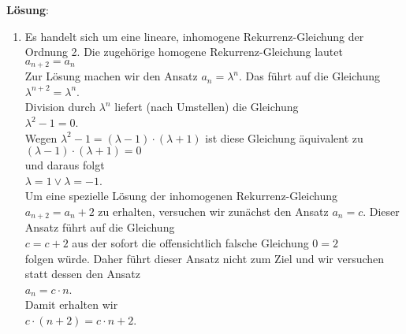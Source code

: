 \documentclass{article}
\begin{document}
\noindent
\textbf{L\"osung}:
\begin{enumerate}
\item Es handelt sich um eine lineare, inhomogene Rekurrenz-Gleichung der Ordnung 2.
      Die zugeh\"orige homogene Rekurrenz-Gleichung lautet
      \\[0.2cm]
      \hspace*{1.3cm}
      $a_{n+2} = a_n$
      \\[0.2cm]
      Zur L\"osung machen wir den Ansatz $a_n = \lambda^n$.  Das f\"uhrt auf die Gleichung
      \\[0.2cm]
      \hspace*{1.3cm}
      $\lambda^{n+2} = \lambda^n$.
      \\[0.2cm]
      Division durch $\lambda^n$ liefert (nach Umstellen) die Gleichung
      \\[0.2cm]
      \hspace*{1.3cm}
      $\lambda^2 - 1 = 0$.
      \\[0.2cm]
      Wegen $\lambda^2 - 1 = (\lambda - 1) \cdot (\lambda + 1)$ ist diese Gleichung \"aquivalent zu
      \\[0.2cm]
      \hspace*{1.3cm}
      $(\lambda - 1) \cdot (\lambda + 1) = 0$
      \\[0.2cm]
      und daraus folgt
      \\[0.2cm]
      \hspace*{1.3cm}
      $\lambda = 1 \vee \lambda = - 1$.
      \\[0.2cm]
      Um eine spezielle L\"osung der inhomogenen Rekurrenz-Gleichung $a_{n+2} = a_n +2$ zu erhalten,
      versuchen wir zun\"achst den Ansatz $a_n = c$.  Dieser Ansatz f\"uhrt auf die Gleichung
      \\[0.2cm]
      \hspace*{1.3cm}
      $c = c + 2$ \quad aus der sofort die offensichtlich falsche Gleichung \quad $0 = 2$
      \\[0.2cm]
      folgen w\"urde.  Daher f\"uhrt dieser Ansatz nicht zum Ziel und wir versuchen statt dessen den Ansatz
      \\[0.2cm]
      \hspace*{1.3cm}
      $a_n = c \cdot n$.
      \\[0.2cm]
      Damit erhalten wir
      \\[0.2cm]
      \hspace*{1.3cm}
      $c \cdot (n+2) = c \cdot n + 2$.
      \\[0.2cm]

\end{enumerate}
\end{document}
